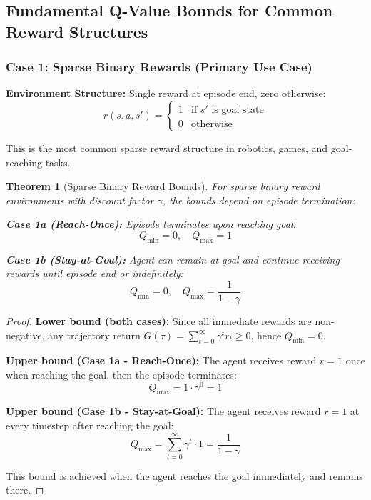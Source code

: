 \documentclass[11pt]{article}
\newtheorem{theorem}{Theorem}
\theoremstyle{definition}
\theoremstyle{remark}
\begin{document}
\subsection{Fundamental Q-Value Bounds for Common Reward Structures}

\subsubsection{Case 1: Sparse Binary Rewards (Primary Use Case)}

\textbf{Environment Structure:} Single reward at episode end, zero otherwise:
$$r(s,a,s') = \begin{cases} 
1 & \text{if } s' \text{ is goal state} \\ 
0 & \text{otherwise}
\end{cases}$$

This is the most common sparse reward structure in robotics, games, and goal-reaching tasks.

\begin{theorem}[Sparse Binary Reward Bounds]
\label{thm:sparse-binary-bounds}
For sparse binary reward environments with discount factor $\gamma$, the bounds depend on episode termination:

\textbf{Case 1a (Reach-Once):} Episode terminates upon reaching goal:
$$Q_{\min} = 0, \quad Q_{\max} = 1$$

\textbf{Case 1b (Stay-at-Goal):} Agent can remain at goal and continue receiving rewards until episode end or indefinitely:
$$Q_{\min} = 0, \quad Q_{\max} = \frac{1}{1-\gamma}$$
\end{theorem}

\begin{proof}
\textbf{Lower bound (both cases):} Since all immediate rewards are non-negative, any trajectory return $G(\tau) = \sum_{t=0}^{\infty} \gamma^t r_t \geq 0$, hence $Q_{\min} = 0$.

\textbf{Upper bound (Case 1a - Reach-Once):} The agent receives reward $r=1$ once when reaching the goal, then the episode terminates:
$$Q_{\max} = 1 \cdot \gamma^0 = 1$$

\textbf{Upper bound (Case 1b - Stay-at-Goal):} The agent receives reward $r=1$ at every timestep after reaching the goal:
$$Q_{\max} = \sum_{t=0}^{\infty} \gamma^t \cdot 1 = \frac{1}{1-\gamma}$$

This bound is achieved when the agent reaches the goal immediately and remains there.
\end{proof}
\end{document}
